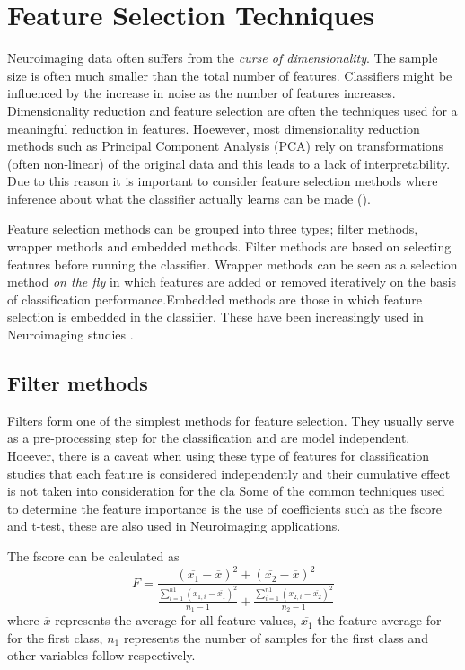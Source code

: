 \documentclass[msthesis.tex]{subfiles}
\begin{document}
\section{Feature Selection Techniques}
Neuroimaging data often suffers from the \textit{curse of dimensionality}. The sample size is often much smaller than the total number of features. Classifiers might be influenced by the increase in noise as the number of features increases. Dimensionality reduction and feature selection are often the techniques used for a meaningful reduction in features. Hoewever, most dimensionality reduction methods such as Principal Component Analysis (PCA) rely on transformations (often non-linear) of the original data and this leads to a lack of interpretability. Due to this reason it is important to consider feature selection methods where inference about what the classifier actually learns can be made (\cite{shi2018feature}). 

Feature selection methods can be grouped into three types; filter methods, wrapper methods and embedded methods. Filter methods are based on selecting features before running the classifier. Wrapper methods can be seen as a selection method \textit{on the fly} in which features are added or removed iteratively on the basis of classification performance.Embedded methods are those in which feature selection is embedded in the classifier. These have been increasingly used in Neuroimaging studies \cite{tohka2016comparison}.

\subsection{Filter methods}
Filters form one of the simplest methods for feature selection. They usually serve as a pre-processing step for the classification and are model independent. Hoeever, there is a caveat when using these type of features for classification studies that each feature is considered independently and their cumulative effect is not taken into consideration for the cla
Some of the common techniques used to determine the feature importance is the use of coefficients such as the fscore and t-test, these are also used in Neuroimaging applications. 

The fscore can be calculated as 
\begin{equation}
\label{eq:fscores}
    F = \frac{(\overline{x_{1}} - \overline{x})^2 + (\overline{x_{2}} - \overline{x})^2}
    {\frac{\sum_{i=1}^{n1}(x_{1,i} - \overline{x_{1}})^2}{n_{1} -1} + \frac{\sum_{i=1}^{n1}(x_{2,i} - \overline{x_{2}})^2}{n_{2} -1}}
\end{equation}
where $\overline{x}$ represents the average for all feature values, $\overline{x_{1}}$ the feature average for for the first class, $n_{1}$ represents the number of samples for the first class and other variables follow respectively.
\end{document}
